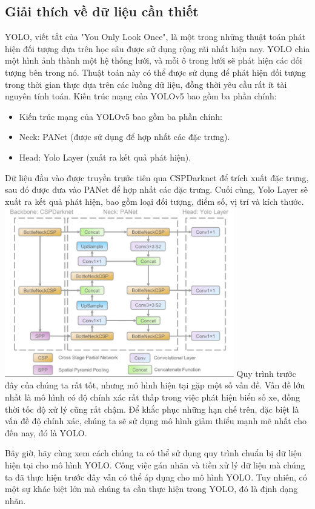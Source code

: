 \documentclass{article}
\begin{document}
\subsection{Giải thích về dữ liệu cần thiết}
YOLO, viết tắt của "You Only Look Once", là một trong những thuật toán phát hiện đối tượng dựa trên học sâu được sử dụng rộng rãi nhất hiện nay. YOLO chia một hình ảnh thành một hệ thống lưới, và mỗi ô trong lưới sẽ phát hiện các đối tượng bên trong nó. Thuật toán này có thể được sử dụng để phát hiện đối tượng trong thời gian thực dựa trên các luồng dữ liệu, đồng thời yêu cầu rất ít tài nguyên tính toán.
Kiến trúc mạng của YOLOv5 bao gồm ba phần chính:
\begin{itemize}
    \item Kiến trúc mạng của YOLOv5 bao gồm ba phần chính:
    \item Neck: PANet (được sử dụng để hợp nhất các đặc trưng).
    \item Head: Yolo Layer (xuất ra kết quả phát hiện).
\end{itemize}
Dữ liệu đầu vào được truyền trước tiên qua CSPDarknet để trích xuất đặc trưng, sau đó được đưa vào PANet để hợp nhất các đặc trưng. Cuối cùng, Yolo Layer sẽ xuất ra kết quả phát hiện, bao gồm loại đối tượng, điểm số, vị trí và kích thước.\\
\includegraphics[width= 10cm]{img/img/Screenshot 2024-11-21 192454.png}
Quy trình trước đây của chúng ta rất tốt, nhưng mô hình hiện tại gặp một số vấn đề. Vấn đề lớn nhất là mô hình có độ chính xác rất thấp trong việc phát hiện biển số xe, đồng thời tốc độ xử lý cũng rất chậm. Để khắc phục những hạn chế trên, đặc biệt là vấn đề độ chính xác, chúng ta sẽ sử dụng mô hình giảm thiểu mạnh mẽ nhất cho đến nay, đó là YOLO.

Bây giờ, hãy cùng xem cách chúng ta có thể sử dụng quy trình chuẩn bị dữ liệu hiện tại cho mô hình YOLO. Công việc gán nhãn và tiền xử lý dữ liệu mà chúng ta đã thực hiện trước đây vẫn có thể áp dụng cho mô hình YOLO. Tuy nhiên, có một sự khác biệt lớn mà chúng ta cần thực hiện trong YOLO, đó là định dạng nhãn.
\end{document}
